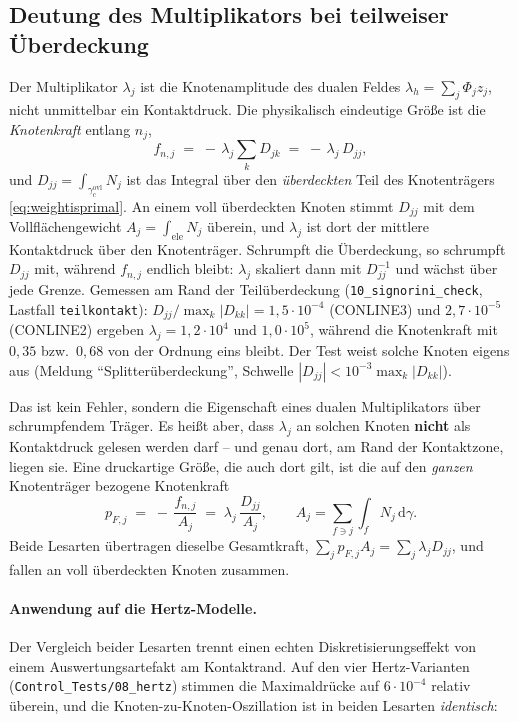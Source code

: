 \documentclass[a4paper,11pt]{article}
\def\bm#1{#1}%
\def\tilde#1{#1}%
\newcommand{\code}[1]{\texttt{\small #1}}
\newcommand{\file}[1]{\texttt{\small #1}}
\begin{document}
\subsection{Deutung des Multiplikators bei teilweiser Überdeckung}
\label{sec:lambdadeutung}

Der Multiplikator $\lambda_j$ ist die Knotenamplitude des dualen Feldes
$\bm\lambda_h=\sum_j\Phi_j\bm z_j$, nicht unmittelbar ein Kontaktdruck. Die physikalisch
eindeutige Größe ist die \emph{Knotenkraft} entlang $\bm n_j$,
\begin{equation}
f_{n,j} \;=\; -\,\lambda_j\sum_k D_{jk} \;=\; -\,\lambda_j\,\tilde D_{jj},
\label{eq:nodalforce}
\end{equation}
und $\tilde D_{jj}=\int_{\gamma_c^{\text{ovl}}}\tilde N_j$ ist das Integral über den
\emph{überdeckten} Teil des Knotenträgers \eqref{eq:weightisprimal}. An einem voll überdeckten
Knoten stimmt $\tilde D_{jj}$ mit dem Vollflächengewicht
$A_j=\int_{\text{ele}}\tilde N_j$ überein, und $\lambda_j$ ist dort der mittlere Kontaktdruck über
den Knotenträger. Schrumpft die Überdeckung, so schrumpft $\tilde D_{jj}$ mit, während
$f_{n,j}$ endlich bleibt: $\lambda_j$ skaliert dann mit $\tilde D_{jj}^{-1}$ und wächst über
jede Grenze. Gemessen am Rand der Teilüberdeckung (\file{10\_signorini\_check}, Lastfall
\code{teilkontakt}): $\tilde D_{jj}/\max_k|\tilde D_{kk}|=1{,}5\cdot10^{-4}$ (CONLINE3) und
$2{,}7\cdot10^{-5}$ (CONLINE2) ergeben $\lambda_j=1{,}2\cdot10^{4}$ und $1{,}0\cdot10^{5}$,
während die Knotenkraft mit $0{,}35$ bzw.\ $0{,}68$ von der Ordnung eins bleibt. Der Test weist
solche Knoten eigens aus (Meldung ``Splitterüberdeckung'', Schwelle
$|\tilde D_{jj}|<10^{-3}\max_k|\tilde D_{kk}|$).

Das ist kein Fehler, sondern die Eigenschaft eines dualen Multiplikators über schrumpfendem
Träger. Es heißt aber, dass $\lambda_j$ an solchen Knoten \textbf{nicht} als Kontaktdruck gelesen
werden darf -- und genau dort, am Rand der Kontaktzone, liegen sie. Eine druckartige Größe, die
auch dort gilt, ist die auf den \emph{ganzen} Knotenträger bezogene Knotenkraft
\begin{equation}
p_{F,j} \;=\; -\,\frac{f_{n,j}}{A_j} \;=\; \lambda_j\,\frac{\tilde D_{jj}}{A_j},
\qquad A_j=\sum_{f\ni j}\int_f \tilde N_j\,\mathrm d\gamma .
\label{eq:pforce}
\end{equation}
Beide Lesarten übertragen dieselbe Gesamtkraft, $\sum_j p_{F,j}A_j=\sum_j\lambda_j\tilde D_{jj}$,
und fallen an voll überdeckten Knoten zusammen.

\paragraph{Anwendung auf die Hertz-Modelle.} Der Vergleich beider Lesarten trennt einen echten
Diskretisierungseffekt von einem Auswertungsartefakt am Kontaktrand. Auf den vier Hertz-Varianten
(\file{Control\_Tests/08\_hertz}) stimmen die Maximaldrücke auf $6\cdot10^{-4}$ relativ überein,
und die Knoten-zu-Knoten-Oszillation ist in beiden Lesarten \emph{identisch}:
\end{document}
